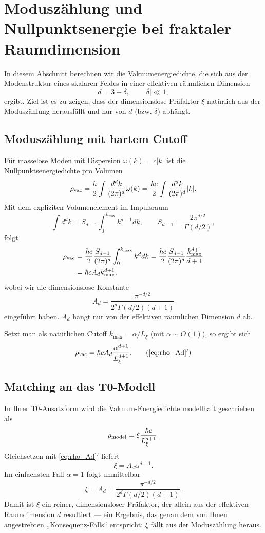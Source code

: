 \documentclass[12pt,a4paper]{article}
\begin{document}
	\section{Moduszählung und Nullpunktsenergie bei fraktaler Raumdimension}
	\label{sec:modecounting}
	
	In diesem Abschnitt berechnen wir die Vakuumenergiedichte, die sich aus der Modenstruktur eines skalaren Feldes in einer effektiven räumlichen Dimension
	\[
	d = 3 + \delta,\qquad |\delta|\ll 1,
	\]
	ergibt. Ziel ist es zu zeigen, dass der dimensionslose Präfaktor \(\xi\) natürlich aus der Moduszählung herausfällt und nur von \(d\) (bzw. \(\delta\)) abhängt.
	
	\subsection{Moduszählung mit hartem Cutoff}
	Für masselose Moden mit Dispersion \(\omega(k)=c|k|\) ist die Nullpunktsenergiedichte pro Volumen
	\[
	\rho_{\rm vac} = \frac{\hbar}{2}\int \frac{d^{d}k}{(2\pi)^d}\omega(k)
	= \frac{\hbar c}{2}\int\frac{d^{d}k}{(2\pi)^d}|k|.
	\]
	Mit dem expliziten Volumenelement im Impulsraum
	\[
	\int d^{d}k = S_{d-1}\int_0^{k_{\max}} k^{d-1}dk,
	\qquad
	S_{d-1}=\frac{2\pi^{d/2}}{\Gamma(d/2)},
	\]
	folgt
	\begin{align}
		\rho_{\rm vac}
		&= \frac{\hbar c}{2}\frac{S_{d-1}}{(2\pi)^d}\int_0^{k_{\max}} k^{d}dk
		= \frac{\hbar c}{2}\frac{S_{d-1}}{(2\pi)^d}\frac{k_{\max}^{d+1}}{d+1}
		\nonumber\\
		&= \hbar c  A_d  k_{\max}^{d+1},
		\label{eq:rho_Ad}
	\end{align}
	wobei wir die dimensionslose Konstante
	\[
	\boxed{A_d = \dfrac{\pi^{-d/2}}{2^d\Gamma(d/2)(d+1)}}
	\]
	eingeführt haben. \(A_d\) hängt nur von der effektiven räumlichen Dimension \(d\) ab.
	
	Setzt man als natürlichen Cutoff \(k_{\max}=\alpha/L_\xi\) (mit \(\alpha\sim O(1)\)), so ergibt sich
	\[
	\rho_{\rm vac} = \hbar c  A_d  \frac{\alpha^{d+1}}{L_\xi^{d+1}}.
	\tag{\ref{eq:rho_Ad}$'$}
	\]
	
	\subsection{Matching an das T0-Modell}
	In Ihrer T0-Ansatzform wird die Vakuum-Energiedichte modellhaft geschrieben als
	\[
	\rho_{\rm model}=\xi\frac{\hbar c}{L_\xi^{d+1}}.
	\]
	Gleichsetzen mit \eqref{eq:rho_Ad}$'$ liefert
	\[
	\boxed{\xi = A_d\alpha^{d+1}}.
	\]
	Im einfachsten Fall \(\alpha=1\) folgt unmittelbar
	\[
	\boxed{\xi = A_d = \dfrac{\pi^{-d/2}}{2^d\Gamma(d/2)(d+1)}}.
	\]
	Damit ist \(\xi\) ein reiner, dimensionsloser Präfaktor, der allein aus der effektiven Raumdimension \(d\) resultiert — ein Ergebnis, das genau dem von Ihnen angestrebten „Konsequenz-Falls“ entspricht: \(\xi\) fällt aus der Moduszählung heraus.
	
\end{document}
